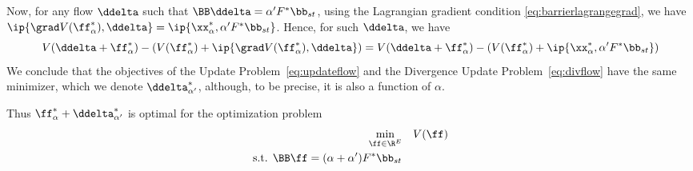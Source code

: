 Now, for any flow $\ddelta$ such that $\BB\ddelta = \alpha' F^*
\bb_{st}$, using the Lagrangian gradient condition
\eqref{eq:barrierlagrangegrad},
we have
$\ip{\grad V(\ff^*_{\alpha}), \ddelta} = \ip{\xx^*_{\alpha}, \alpha' F^*
  \bb_{st}}$.
Hence, for such $\ddelta$, we have 
\[
    V(\ddelta+\ff^*_{\alpha})
  -
\left(
  V(\ff^*_{\alpha})
  +
  \ip{\grad V(\ff^*_{\alpha}), \ddelta}
\right)
=
    V(\ddelta+\ff^*_{\alpha})
  -
\left(
 V(\ff^*_{\alpha})
  +
\ip{\xx^*_{\alpha}, \alpha' F^*\bb_{st}}
\right)
\]
We conclude that the objectives of the Update
Problem~\eqref{eq:updateflow} and the Divergence Update
Problem~\eqref{eq:divflow} have the same minimizer, which we denote
$\ddelta^*_{\alpha'}$, although, to be precise, it is also a function of $\alpha$.




Thus $\ff^*_{\alpha}+\ddelta^*_{\alpha'}$ is optimal for the
optimization problem
  \begin{equation}
   \label{eq:barrierflowupdated}
\begin{aligned}
\min_{\ff \in \R^E} & \quad V(\ff)\\
\textrm{s.t. }  \BB\ff= (\alpha+\alpha') F^* \bb_{st}
\end{aligned}
\end{equation}

